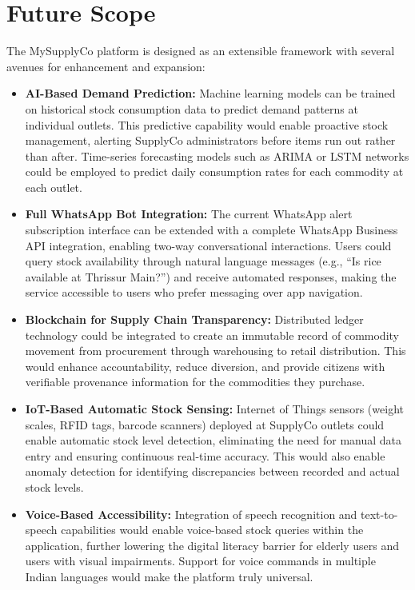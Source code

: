 \section{Future Scope}

The MySupplyCo platform is designed as an extensible framework with several avenues for enhancement and expansion:

\begin{itemize}
    \item \textbf{AI-Based Demand Prediction:} Machine learning models can be trained on historical stock consumption data to predict demand patterns at individual outlets. This predictive capability would enable proactive stock management, alerting SupplyCo administrators before items run out rather than after. Time-series forecasting models such as ARIMA or LSTM networks could be employed to predict daily consumption rates for each commodity at each outlet.

    \item \textbf{Full WhatsApp Bot Integration:} The current WhatsApp alert subscription interface can be extended with a complete WhatsApp Business API integration, enabling two-way conversational interactions. Users could query stock availability through natural language messages (e.g., ``Is rice available at Thrissur Main?'') and receive automated responses, making the service accessible to users who prefer messaging over app navigation.

    \item \textbf{Blockchain for Supply Chain Transparency:} Distributed ledger technology could be integrated to create an immutable record of commodity movement from procurement through warehousing to retail distribution. This would enhance accountability, reduce diversion, and provide citizens with verifiable provenance information for the commodities they purchase.

    \item \textbf{IoT-Based Automatic Stock Sensing:} Internet of Things sensors (weight scales, RFID tags, barcode scanners) deployed at SupplyCo outlets could enable automatic stock level detection, eliminating the need for manual data entry and ensuring continuous real-time accuracy. This would also enable anomaly detection for identifying discrepancies between recorded and actual stock levels.

    \item \textbf{Voice-Based Accessibility:} Integration of speech recognition and text-to-speech capabilities would enable voice-based stock queries within the application, further lowering the digital literacy barrier for elderly users and users with visual impairments. Support for voice commands in multiple Indian languages would make the platform truly universal.


\end{itemize}
